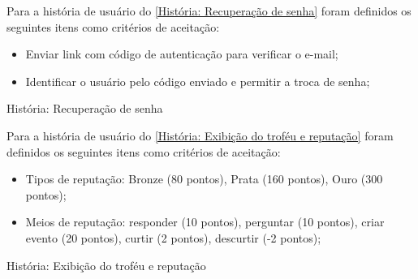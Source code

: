 Para a história de usuário do \autoref{História: Recuperação de senha} foram definidos os seguintes itens como critérios de aceitação:

\begin{itemize}
\item Enviar link com código de autenticação para verificar o e-mail;
\item Identificar o usuário pelo código enviado e permitir a troca de senha;
\end{itemize}

\def\arraystretch{2}
\begin{quadro}[htb]
\centering
\ABNTEXfontereduzida
\caption[História: Recuperação de senha]{História: Recuperação de senha}
\label{História: Recuperação de senha}
\end{quadro}
\FloatBarrier 

Para a história de usuário do \autoref{História: Exibição do troféu e reputação} foram definidos os seguintes itens como critérios de aceitação:

\begin{itemize}
\item Tipos de reputação: Bronze (80 pontos), Prata (160 pontos), Ouro (300 pontos); 
\item Meios de reputação: responder (10 pontos), perguntar (10 pontos), criar evento (20 pontos), curtir (2 pontos), descurtir (-2 pontos);
\end{itemize}

\def\arraystretch{2}
\begin{quadro}[htb]
\centering
\ABNTEXfontereduzida
\caption[História: Exibição do troféu e reputação]{História: Exibição do troféu e reputação}
\label{História: Exibição do troféu e reputação}
\end{quadro}
\FloatBarrier 

